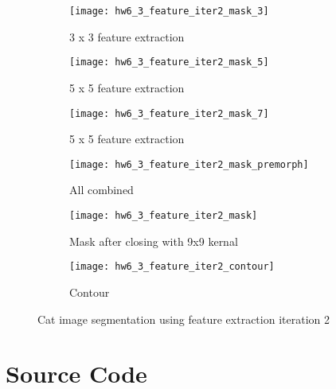 \documentclass[11pt]{article}
\begin{document}
\begin{figure}[H]
\begin{subfigure}{.5\textwidth}
  \centering
  \texttt{[image: hw6\_3\_feature\_iter2\_mask\_3]}
  \caption{3 x 3 feature extraction}
  \label{}
\end{subfigure}
\begin{subfigure}{.5\textwidth}
  \centering
  \texttt{[image: hw6\_3\_feature\_iter2\_mask\_5]}
  \caption{5 x 5 feature extraction}
  \label{}
\end{subfigure}

\begin{subfigure}{.5\textwidth}
  \centering
  \texttt{[image: hw6\_3\_feature\_iter2\_mask\_7]}
  \caption{5 x 5 feature extraction}
  \label{}
\end{subfigure}
\begin{subfigure}{.5\textwidth}
  \centering
  \texttt{[image: hw6\_3\_feature\_iter2\_mask\_premorph]}
  \caption{All combined}
  \label{}
\end{subfigure}

\begin{subfigure}{.5\textwidth}
  \centering
  \texttt{[image: hw6\_3\_feature\_iter2\_mask]}
  \caption{Mask after closing with 9x9 kernal}
  \label{}
\end{subfigure}
\begin{subfigure}{.5\textwidth}
  \centering
  \texttt{[image: hw6\_3\_feature\_iter2\_contour]}
  \caption{Contour}
  \label{}
\end{subfigure}

\caption{Cat image segmentation using feature extraction iteration 2}
\label{}
\end{figure}



\section*{Source Code}
\end{document}
